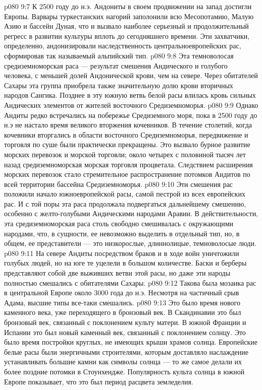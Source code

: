 \vs p080 9:7 К 2500 году до н.э. Андониты в своем продвижении на запад достигли Европы. Варвары туркестанских нагорий заполонили всю Месопотамию, Малую Азию и бассейн Дуная, что и вызвало наиболее серьезный и продолжительный регресс в развитии культуры вплоть до сегодняшнего времени. Эти захватчики, определенно, андонизировали наследственность центральноевропейских рас, сформировав так называемый альпийский тип.
\vs p080 9:8 \pc {}\bibnobreakspace {} Эта темноволосая средиземноморская раса --- результат смешения Андического и голубого человека, с меньшей долей Андонической крови, чем на севере. Через обитателей Сахары эта группа приобрела также значительную долю крови вторичных народов Сангика. Позднее в эту южную ветвь белой расы влилась кровь сильных Андических элементов от жителей восточного Средиземноморья.
\vs p080 9:9 Однако Андиты редко встречались на побережье Средиземного моря, пока в 2500 году до н.э не настало время великого вторжения кочевников. В течение столетий, когда кочевники вторгались в области восточного Средиземноморья, передвижение и торговля по суше были практически прекращены. Это вызвало бурное развитие морских перевозок и морской торговли; около четырех с половиной тысяч лет назад средиземноморская морская торговля процветала. Следствием расширения морских перевозок стало стремительное распространение потомков Андитов по всей территории бассейна Средиземноморья.
\vs p080 9:10 Эти смешения рас положили начало южноевропейской расы, самой пестрой из всех европейских рас. И с той поры эта раса продолжала подвергаться дальнейшему смешению, особенно с желто\hyp{}голубыми Андическими народами Аравии. В действительности, эта средиземноморская раса столь свободно смешивалась с окружающими народами, что, в сущности, ее невозможно выделить в отдельный тип, но, в общем, ее представители --- это низкорослые, длиннолицые, темноволосые люди.
\vs p080 9:11 На севере Андиты посредством браков и в ходе войн уничтожили голубых людей, но на юге те уцелели в большом количестве. Баски и берберы представляют собой две выживших ветви этой расы, но даже эти народы полностью смешались с обитателями Сахары.
\vs p080 9:12 \pc Такова была мозаика рас в центральной Европе около 3000 года до н.э. Несмотря на частичный срыв Адама, высшие типы все\hyp{}таки смешались.
\vs p080 9:13 \pc Это было время нового каменного века, уже переходящего в бронзовый век. В Скандинавии это был бронзовый век, связанный с поклонением культу матери. В южной Франции и Испании это был новый каменный век, связанный с поклонением солнцу. Это было время постройки круглых, не имеющих крыши храмов солнца. Европейские белые расы были энергичными строителями, которым доставляло наслаждение устанавливать большие камни как символы солнца --- то же самое делали их более поздние потомки в Стоунхендже. Популярность культа солнца в южной Европе показывает, что это был период расцвета земледелия.
